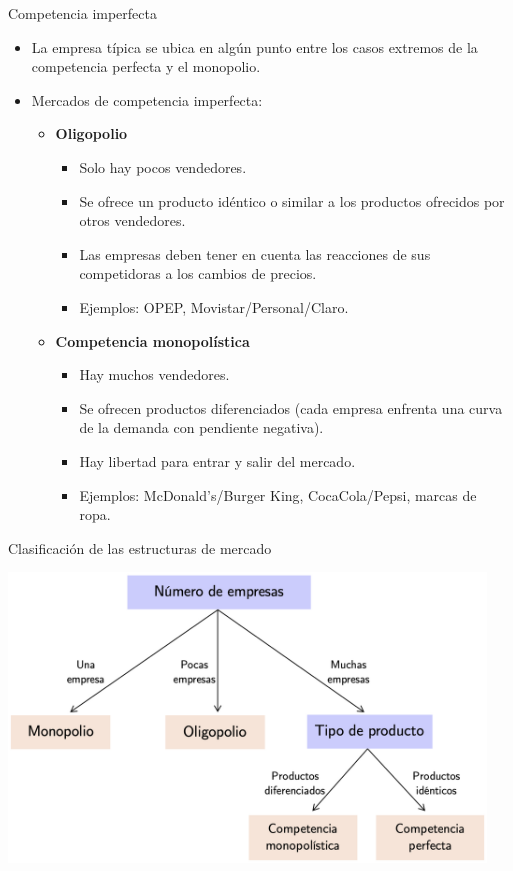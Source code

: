 \documentclass{beamer}
\begin{document}
\begin{frame}{Competencia imperfecta}
    \begin{itemize}
        \item La empresa típica se ubica en algún punto entre los casos extremos de la competencia perfecta y el monopolio. \vspace{2mm}
        \item Mercados de competencia imperfecta: \vspace{1mm}
        \begin{itemize}
            \item \textbf{Oligopolio}
            \begin{itemize}
            \item Solo hay pocos vendedores.
            \item Se ofrece un producto idéntico o similar a los productos ofrecidos por otros vendedores.
            \item Las empresas deben tener en cuenta las reacciones de sus competidoras a los cambios de precios.
            \item Ejemplos: OPEP, Movistar/Personal/Claro. 
            \end{itemize} 
            \vspace{1mm}
            \item \textbf{Competencia monopolística}
            \begin{itemize}
            \item Hay muchos vendedores.
            \item Se ofrecen productos diferenciados (cada empresa enfrenta una curva de la demanda con pendiente negativa).
            \item Hay libertad para entrar y salir del mercado. 
            \item Ejemplos: McDonald's/Burger King, CocaCola/Pepsi, marcas de ropa.
             \end{itemize} 
        \end{itemize}
    \end{itemize}
\end{frame}

\begin{frame}{Clasificación de las estructuras de mercado}

    \centering
    \includegraphics[width=0.95\textwidth]{../Figures/Tipos_mercados.jpg}
    
\end{frame}
\end{document}
